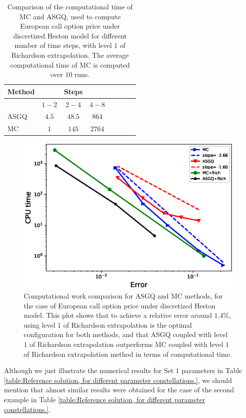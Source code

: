 \begin{table}[h!]
	\centering
	\begin{tabular}{l*{6}{c}r}
		\toprule[1.5pt]
	Method & & Steps  & &      &\\
	\hline
	         & $1-2$ & $2-4$  & $4-8$ \\
	         	\hline
		ASGQ & $4.5$  & $48.5$ & $864$  \\
				MC  &   $1$& $145$& $2764$   \\
		\bottomrule[1.25pt]
	\end{tabular}
	\caption{Comparison of the computational time of  MC and ASGQ, used to compute European call option price under discretized Heston model for different number of time steps, with level $1$ of Richardson extrapolation. The average computational time of MC is computed over $10$ runs.}
	\label{table:The computational time of  ASGQ, used to compute European call option price under discretized Heston model for different number of time steps, with level $1$ Richardson extrapolation.}
\end{table}


\FloatBarrier
	\begin{figure}[h!]
\centering
\includegraphics[width=0.5\linewidth]{./figures/Heston_single_call_smooth_vol/complexity_rates/set1/error_vs_time}

\caption{Computational work comparison for ASGQ and MC methods, for the case of European call option price under discretized Heston model. This plot shows that to achieve a relative error around $1.4\%$, using level $1$ of Richardson extrapolation is the optimal configuration for both methods, and that ASGQ coupled with level $1$ of Richardson extrapolation  outperforms  MC coupled with level $1$ of Richardson extrapolation  method in terms of computational time.}
\label{fig:Complexity plot for MC and MISC , European call option price under discretized Heston model}
\end{figure}
\FloatBarrier

\begin{remark}
Although we just illustrate the numerical results for Set $1$ parameters in Table \ref{table:Reference solution, for different parameter constellations.}, we should mention that almost similar results were obtained for the case of the second example in Table \ref{table:Reference solution, for different parameter constellations.}.
\end{remark}


